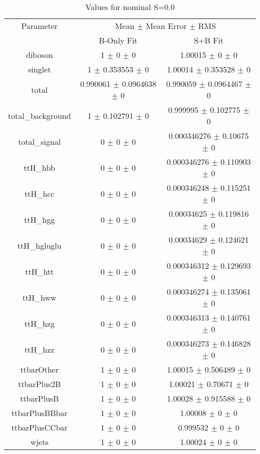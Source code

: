 \begin{table}
\centering
\caption{Values for nominal S=0.0}
\begin{tabular}{ccc}
\toprule
Parameter & \multicolumn{2}{c}{Mean $\pm$ Mean Error $\pm$ RMS}\\
 & B-Only Fit & S+B Fit\\
\midrule
diboson & \num{1} $\pm$ \num{0} $\pm$ \num{0} & \num{1.00015} $\pm$ \num{0} $\pm$ \num{0}\\
singlet & \num{1} $\pm$ \num{0.353553} $\pm$ \num{0} & \num{1.00014} $\pm$ \num{0.353528} $\pm$ \num{0}\\
total & \num{0.990061} $\pm$ \num{0.0964638} $\pm$ \num{0} & \num{0.990059} $\pm$ \num{0.0964467} $\pm$ \num{0}\\
total\_background & \num{1} $\pm$ \num{0.102791} $\pm$ \num{0} & \num{0.999995} $\pm$ \num{0.102775} $\pm$ \num{0}\\
total\_signal & \num{0} $\pm$ \num{0} $\pm$ \num{0} & \num{0.000346276} $\pm$ \num{0.10675} $\pm$ \num{0}\\
ttH\_hbb & \num{0} $\pm$ \num{0} $\pm$ \num{0} & \num{0.000346276} $\pm$ \num{0.110903} $\pm$ \num{0}\\
ttH\_hcc & \num{0} $\pm$ \num{0} $\pm$ \num{0} & \num{0.000346248} $\pm$ \num{0.115251} $\pm$ \num{0}\\
ttH\_hgg & \num{0} $\pm$ \num{0} $\pm$ \num{0} & \num{0.00034625} $\pm$ \num{0.119816} $\pm$ \num{0}\\
ttH\_hgluglu & \num{0} $\pm$ \num{0} $\pm$ \num{0} & \num{0.00034629} $\pm$ \num{0.124621} $\pm$ \num{0}\\
ttH\_htt & \num{0} $\pm$ \num{0} $\pm$ \num{0} & \num{0.000346312} $\pm$ \num{0.129693} $\pm$ \num{0}\\
ttH\_hww & \num{0} $\pm$ \num{0} $\pm$ \num{0} & \num{0.000346274} $\pm$ \num{0.135061} $\pm$ \num{0}\\
ttH\_hzg & \num{0} $\pm$ \num{0} $\pm$ \num{0} & \num{0.000346313} $\pm$ \num{0.140761} $\pm$ \num{0}\\
ttH\_hzz & \num{0} $\pm$ \num{0} $\pm$ \num{0} & \num{0.000346273} $\pm$ \num{0.146828} $\pm$ \num{0}\\
ttbarOther & \num{1} $\pm$ \num{0} $\pm$ \num{0} & \num{1.00015} $\pm$ \num{0.506489} $\pm$ \num{0}\\
ttbarPlus2B & \num{1} $\pm$ \num{0} $\pm$ \num{0} & \num{1.00021} $\pm$ \num{0.70671} $\pm$ \num{0}\\
ttbarPlusB & \num{1} $\pm$ \num{0} $\pm$ \num{0} & \num{1.00028} $\pm$ \num{0.915588} $\pm$ \num{0}\\
ttbarPlusBBbar & \num{1} $\pm$ \num{0} $\pm$ \num{0} & \num{1.00008} $\pm$ \num{0} $\pm$ \num{0}\\
ttbarPlusCCbar & \num{1} $\pm$ \num{0} $\pm$ \num{0} & \num{0.999532} $\pm$ \num{0} $\pm$ \num{0}\\
wjets & \num{1} $\pm$ \num{0} $\pm$ \num{0} & \num{1.00024} $\pm$ \num{0} $\pm$ \num{0}\\
\bottomrule
\end{tabular}
\end{table}